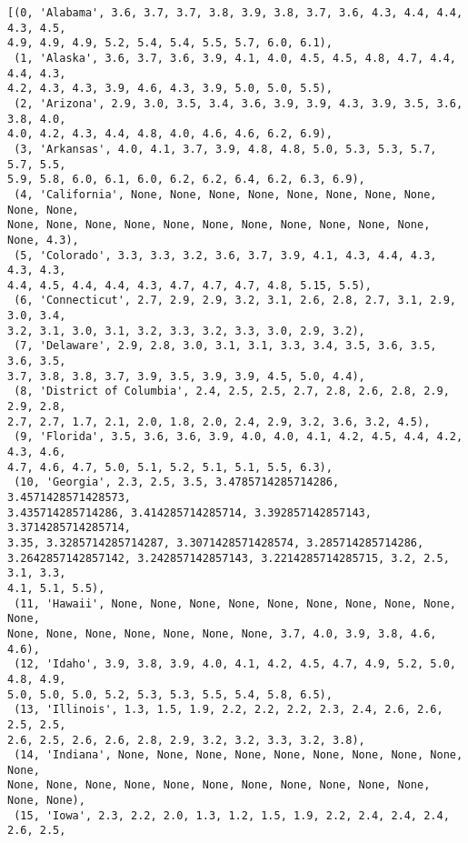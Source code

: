 \documentclass[11pt]{article}
\makeatletter
\newcommand{\boxspacing}{\kern\kvtcb@left@rule\kern\kvtcb@boxsep}
\newcommand{\prompt}[4]{
        {\ttfamily\llap{{\color{#2}[#3]:\hspace{3pt}#4}}\vspace{-\baselineskip}}
    }
\makeatother
\begin{document}
            \begin{tcolorbox}[breakable, size=fbox, boxrule=.5pt, pad at break*=1mm, opacityfill=0]
\prompt{Out}{outcolor}{50}{\boxspacing}
\begin{Verbatim}[commandchars=\\\{\}]
[(0, 'Alabama', 3.6, 3.7, 3.7, 3.8, 3.9, 3.8, 3.7, 3.6, 4.3, 4.4, 4.4, 4.3, 4.5,
4.9, 4.9, 4.9, 5.2, 5.4, 5.4, 5.5, 5.7, 6.0, 6.1),
 (1, 'Alaska', 3.6, 3.7, 3.6, 3.9, 4.1, 4.0, 4.5, 4.5, 4.8, 4.7, 4.4, 4.4, 4.3,
4.2, 4.3, 4.3, 3.9, 4.6, 4.3, 3.9, 5.0, 5.0, 5.5),
 (2, 'Arizona', 2.9, 3.0, 3.5, 3.4, 3.6, 3.9, 3.9, 4.3, 3.9, 3.5, 3.6, 3.8, 4.0,
4.0, 4.2, 4.3, 4.4, 4.8, 4.0, 4.6, 4.6, 6.2, 6.9),
 (3, 'Arkansas', 4.0, 4.1, 3.7, 3.9, 4.8, 4.8, 5.0, 5.3, 5.3, 5.7, 5.7, 5.5,
5.9, 5.8, 6.0, 6.1, 6.0, 6.2, 6.2, 6.4, 6.2, 6.3, 6.9),
 (4, 'California', None, None, None, None, None, None, None, None, None, None,
None, None, None, None, None, None, None, None, None, None, None, None, 4.3),
 (5, 'Colorado', 3.3, 3.3, 3.2, 3.6, 3.7, 3.9, 4.1, 4.3, 4.4, 4.3, 4.3, 4.3,
4.4, 4.5, 4.4, 4.4, 4.3, 4.7, 4.7, 4.7, 4.8, 5.15, 5.5),
 (6, 'Connecticut', 2.7, 2.9, 2.9, 3.2, 3.1, 2.6, 2.8, 2.7, 3.1, 2.9, 3.0, 3.4,
3.2, 3.1, 3.0, 3.1, 3.2, 3.3, 3.2, 3.3, 3.0, 2.9, 3.2),
 (7, 'Delaware', 2.9, 2.8, 3.0, 3.1, 3.1, 3.3, 3.4, 3.5, 3.6, 3.5, 3.6, 3.5,
3.7, 3.8, 3.8, 3.7, 3.9, 3.5, 3.9, 3.9, 4.5, 5.0, 4.4),
 (8, 'District of Columbia', 2.4, 2.5, 2.5, 2.7, 2.8, 2.6, 2.8, 2.9, 2.9, 2.8,
2.7, 2.7, 1.7, 2.1, 2.0, 1.8, 2.0, 2.4, 2.9, 3.2, 3.6, 3.2, 4.5),
 (9, 'Florida', 3.5, 3.6, 3.6, 3.9, 4.0, 4.0, 4.1, 4.2, 4.5, 4.4, 4.2, 4.3, 4.6,
4.7, 4.6, 4.7, 5.0, 5.1, 5.2, 5.1, 5.1, 5.5, 6.3),
 (10, 'Georgia', 2.3, 2.5, 3.5, 3.4785714285714286, 3.4571428571428573,
3.435714285714286, 3.414285714285714, 3.392857142857143, 3.3714285714285714,
3.35, 3.3285714285714287, 3.3071428571428574, 3.285714285714286,
3.2642857142857142, 3.242857142857143, 3.2214285714285715, 3.2, 2.5, 3.1, 3.3,
4.1, 5.1, 5.5),
 (11, 'Hawaii', None, None, None, None, None, None, None, None, None, None,
None, None, None, None, None, None, None, 3.7, 4.0, 3.9, 3.8, 4.6, 4.6),
 (12, 'Idaho', 3.9, 3.8, 3.9, 4.0, 4.1, 4.2, 4.5, 4.7, 4.9, 5.2, 5.0, 4.8, 4.9,
5.0, 5.0, 5.0, 5.2, 5.3, 5.3, 5.5, 5.4, 5.8, 6.5),
 (13, 'Illinois', 1.3, 1.5, 1.9, 2.2, 2.2, 2.2, 2.3, 2.4, 2.6, 2.6, 2.5, 2.5,
2.6, 2.5, 2.6, 2.6, 2.8, 2.9, 3.2, 3.2, 3.3, 3.2, 3.8),
 (14, 'Indiana', None, None, None, None, None, None, None, None, None, None,
None, None, None, None, None, None, None, None, None, None, None, None, None),
 (15, 'Iowa', 2.3, 2.2, 2.0, 1.3, 1.2, 1.5, 1.9, 2.2, 2.4, 2.4, 2.4, 2.6, 2.5,

\end{Verbatim}
\end{tcolorbox}
\end{document}
